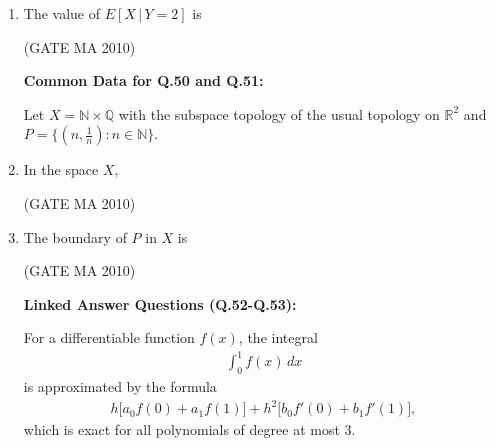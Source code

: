 \documentclass[journal,12pt,onecolumn]{IEEEtran}
\theoremstyle{remark}
\begin{document}
\begin{flushleft}
\begin{enumerate}
\item The value of $E[X\,|\,Y=2]$ is

\hfill(GATE MA 2010)

\begin{enumerate}
\end{enumerate}

\textbf{Common Data for Q.50 and Q.51:} 

Let $X=\mathbb{N}\times\mathbb{Q}$ with the subspace topology of the usual topology on $\mathbb{R}^{2}$ and $P=\{(n,\tfrac{1}{n}):n\in\mathbb{N}\}$.



\item In the space $X$,

\hfill(GATE MA 2010)

\begin{enumerate}
\end{enumerate}

\item The boundary of $P$ in $X$ is

\hfill(GATE MA 2010)

\begin{enumerate}
\end{enumerate}

\textbf{Linked Answer Questions (Q.52-Q.53):}

For a differentiable function $f(x)$, the integral
\begin{align*}
\int_{0}^{1} f(x)\,dx
\end{align*}
is approximated by the formula
\begin{align*}
h\big[a_{0}f(0)+a_{1}f(1)\big]+h^{2}\big[b_{0}f'(0)+b_{1}f'(1)\big],
\end{align*}
which is exact for all polynomials of degree at most $3$.
\newpage



\end{enumerate}
\end{flushleft}
\end{document}
